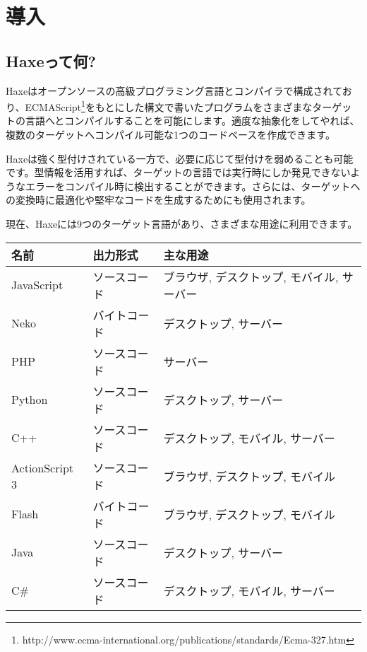 \chapter{導入}
\label{introduction}

\section{Haxeって何?}
\label{introduction-what-is-haxe}


Haxeはオープンソースの高級プログラミング言語とコンパイラで構成されており、ECMAScript\footnote{http://www.ecma-international.org/publications/standards/Ecma-327.htm}をもとにした構文で書いたプログラムをさまざまなターゲットの言語へとコンパイルすることを可能にします。適度な抽象化をしてやれば、複数のターゲットへコンパイル可能な1つのコードベースを作成できます。

Haxeは強く型付けされている一方で、必要に応じて型付けを弱めることも可能です。型情報を活用すれば、ターゲットの言語では実行時にしか発見できないようなエラーをコンパイル時に検出することができます。さらには、ターゲットへの変換時に最適化や堅牢なコードを生成するためにも使用されます。

現在、Haxeには9つのターゲット言語があり、さまざまな用途に利用できます。

\begin{center}
\begin{tabular}{| l | l | l |}
	\hline
	名前 & 出力形式 & 主な用途 \\ \hline
	JavaScript & ソースコード & ブラウザ, デスクトップ, モバイル, サーバー \\
	Neko & バイトコード & デスクトップ, サーバー \\
	PHP & ソースコード & サーバー \\
	Python & ソースコード & デスクトップ, サーバー \\
	C++ & ソースコード & デスクトップ, モバイル, サーバー \\
	ActionScript 3 & ソースコード & ブラウザ, デスクトップ, モバイル \\
	Flash & バイトコード & ブラウザ, デスクトップ, モバイル \\ 
	Java & ソースコード & デスクトップ, サーバー \\
	C\# & ソースコード & デスクトップ, モバイル, サーバー \\ \hline
\end{tabular}
\end{center}


